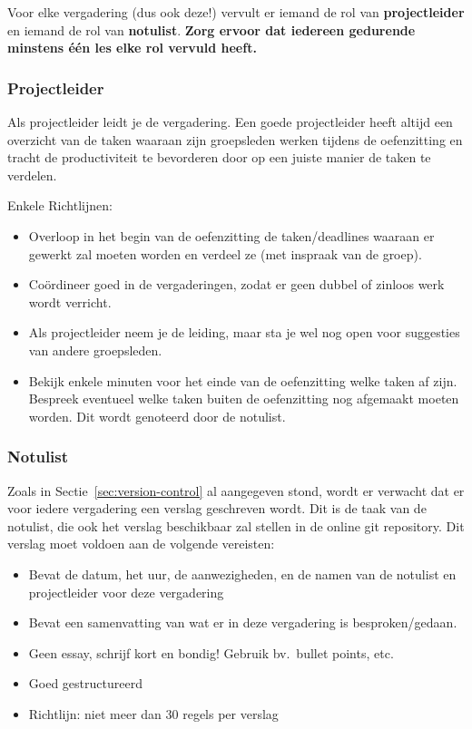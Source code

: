 \documentclass[a4paper]{article}
\begin{document}
Voor elke vergadering (dus ook deze!) vervult er iemand de rol van \textbf{projectleider} en iemand de rol van \textbf{notulist}.
\textbf{Zorg ervoor dat iedereen gedurende minstens \'e\'en les elke rol vervuld heeft.}


\subsubsection{Projectleider}

Als projectleider leidt je de vergadering.
Een goede projectleider heeft altijd een overzicht van de taken waaraan zijn groepsleden werken tijdens de oefenzitting en tracht de productiviteit te bevorderen door op een juiste manier de taken te verdelen.

Enkele Richtlijnen:
\begin{itemize}
	\item Overloop in het begin van de oefenzitting de taken/deadlines waaraan er gewerkt zal moeten worden en verdeel ze (met inspraak van de groep).
	\item Co\"ordineer goed in de vergaderingen, zodat er geen dubbel of zinloos werk wordt verricht.
	\item Als projectleider neem je de leiding, maar sta je wel nog open voor suggesties van andere groepsleden.
	\item Bekijk enkele minuten voor het einde van de oefenzitting welke taken af zijn. Bespreek eventueel welke taken buiten de oefenzitting nog afgemaakt moeten worden. Dit wordt genoteerd door de notulist.
\end{itemize}


\subsubsection{Notulist}

Zoals in Sectie~\ref{sec:version-control} al aangegeven stond, wordt er verwacht dat er voor iedere vergadering een verslag geschreven wordt.
Dit is de taak van de notulist, die ook het verslag beschikbaar zal stellen in de online git repository.
Dit verslag moet voldoen aan de volgende vereisten:

\begin{itemize}
	\item Bevat de datum, het uur, de aanwezigheden, en de namen van de notulist en projectleider voor deze vergadering
	\item Bevat een samenvatting van wat er in deze vergadering is besproken/gedaan.
	\item Geen essay, schrijf kort en bondig! Gebruik bv.\ bullet points, etc.
	\item Goed gestructureerd
	\item Richtlijn: niet meer dan 30 regels per verslag
\end{itemize}
\end{document}
